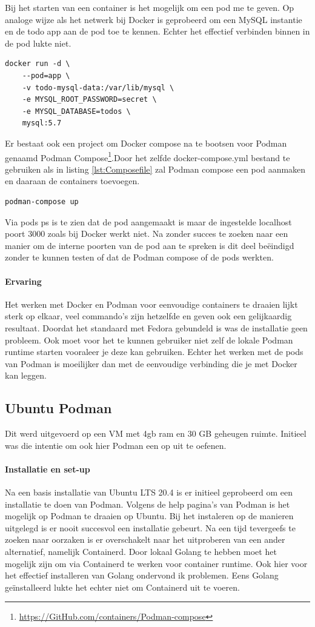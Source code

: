 Bij het starten van een container is het mogelijk om een pod me te geven. Op analoge wijze als het netwerk bij Docker is geprobeerd om een MySQL instantie en de todo app aan de pod toe te kennen. Echter het effectief verbinden binnen in de pod lukte niet.
\begin{lstlisting}
docker run -d \
    --pod=app \
    -v todo-mysql-data:/var/lib/mysql \
    -e MYSQL_ROOT_PASSWORD=secret \
    -e MYSQL_DATABASE=todos \
    mysql:5.7
\end{lstlisting}

Er bestaat ook een project om Docker compose na te bootsen voor Podman genaamd Podman Compose\footnote{\url{https://GitHub.com/containers/Podman-compose}}.Door het zelfde docker-compose.yml bestand te gebruiken als in listing \ref{lst:Composefile} zal Podman compose een pod aanmaken en daaraan de containers toevoegen. 

\begin{verbatim}
podman-compose up
\end{verbatim}
Via pods ps is te zien dat de pod aangemaakt is maar de ingestelde localhost poort 3000 zoals bij Docker werkt niet. Na zonder succes te zoeken naar een manier om de interne poorten van de pod aan te spreken is dit deel beëindigd zonder te kunnen testen of dat de Podman compose of de pods werkten.

\paragraph{Ervaring}
Het werken met Docker en Podman voor eenvoudige containers te draaien lijkt sterk op elkaar, veel commando’s zijn hetzelfde en geven ook een gelijkaardig resultaat. Doordat het standaard met Fedora gebundeld is was de installatie geen probleem. Ook moet voor het te kunnen gebruiker niet zelf de lokale Podman runtime starten vooraleer je deze kan gebruiken. Echter het werken met de pods van Podman is moeilijker dan met de eenvoudige verbinding die je met Docker kan leggen.

\subsection{Ubuntu Podman}
Dit werd uitgevoerd op een VM met 4gb ram en 30 GB geheugen ruimte. Initieel was die intentie om ook hier Podman een op uit te oefenen.

\paragraph{Installatie en set-up}
Na een basis installatie van Ubuntu LTS 20.4 is er initieel geprobeerd om een installatie te doen van Podman. Volgens de help pagina’s van Podman is het mogelijk op Podman te draaien op Ubuntu. Bij het instaleren op de manieren uitgelegd is er nooit succesvol een installatie gebeurt. Na een tijd tevergeefs te zoeken naar oorzaken is er overschakelt naar het uitproberen van een ander alternatief, namelijk Containerd.
Door lokaal Golang te hebben moet het mogelijk zijn om via Containerd te werken voor container runtime. Ook hier voor het effectief installeren van Golang ondervond ik problemen.  Eens Golang geïnstalleerd lukte het echter niet om Containerd uit te voeren.

